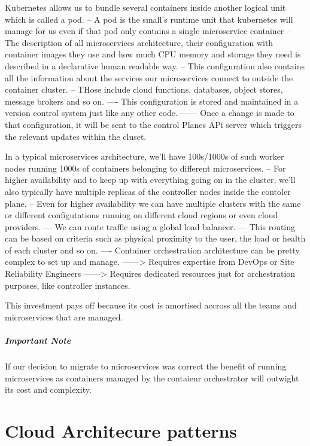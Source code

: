 \documentclass[a4paper, 11pt]{book}
\begin{document}
{    Kubernetes allows us to bundle several containers inside another logical unit which is called a pod.
    -- A pod is the small's runtime unit that kubernetes will manage for us even if that pod only contains a single microservice container
    -- The description of all microservices architecture, their configuration with container images they use and how much CPU memory and storage they need is described in a declarative human readable way.
    -- This configuration also contains all the information about the services our microservices connect to outside the container cluster.
    -- THose include cloud functions, databases, object stores, message brokers and so on.
    ---- This configuration is stored and maintained in a version control system just like any other code.
    ------ Once a change is made to that configuration, it will be sent to the control Planes APi server which triggers the relevant updates within the cluset.

    In a typical microservices architecture, we'll have 100s/1000s of such worker nodes running 1000s of containers belonging to different microservices.
    -- For higher availability and to keep up with everything going on in the cluster, we'll also typically have multiple replicas of the controller nodes inside the contoler plane.
    -- Even for higher availability we can have multiple clusters with the same or different configutations running on different cloud regions or even cloud providers.
    --- We can route traffic using a global load balancer.
    --- This routing can be based on criteria such as physical proximity to the user, the load or health of each cluster and so on.
    ---- Container orchestration architecture can be pretty complex to set up and manage.
    ------> Requires expertise from DevOps or Site Reliability Engineers
    ------> Requires dedicated resources just for orchestration purposes, like controller instances.

    This investment pays off because its cost is amortised accross all the teams and microservices that are managed.

    \paragraph{Important Note}
    If our decision to migrate to microservices was correct the benefit of running microservices as containers managed by the contaienr orchestrator will outwight its cost and complexity.


    \chapter{Cloud Architecure patterns}

}
\end{document}
